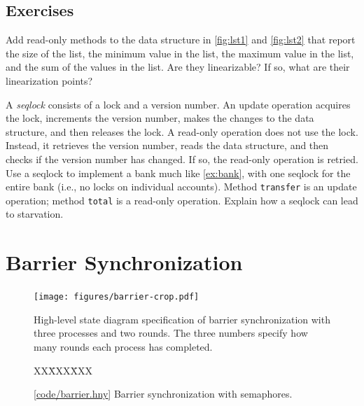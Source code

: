 \documentclass{report}
\newcommand{\harmonysource}[1]{
\begin{tabbing}
XX\=XXX\=XXX\kill
    
\end{tabbing}
}
\newcommand{\harmonylink}[1]{%
[\href{https://www.cs.cornell.edu/home/rvr/harmony/#1}{\underline{#1}}]%
}
\newenvironment{code}{
\tcolorbox
}{
\endtcolorbox
}
\begin{document}
\section*{Exercises}
\begin{problems}
\item Add read-only methods to the data structure in \autoref{fig:lst1}
and \autoref{fig:lst2} that report the size of the list, the minimum value in the
list, the maximum value in the list, and the sum of the values in the list.
Are they linearizable?  If so, what are their linearization points?
\item A \emph{seqlock}
%
consists of a lock and a version number.
An update operation acquires the lock, increments the version number, makes the
changes to the data structure, and then releases the lock.  A read-only operation
does not use the lock.  Instead, it retrieves the version number,
reads the data structure, and then checks if the
version number has changed.  If so, the read-only operation is retried.
Use a seqlock to implement a bank much like \autoref{ex:bank}, with
one seqlock for the entire bank (i.e., no locks on individual accounts).
Method \texttt{transfer} is an update operation; method \texttt{total} is a
read-only operation.  Explain how a seqlock can lead to starvation.
\end{problems}

\chapter{Barrier Synchronization}
\label{ch:barrier}
%

%

\begin{figure}
\begin{center}
\texttt{[image: figures/barrier-crop.pdf]}
\end{center}
\caption{High-level state diagram specification of barrier synchronization
with three processes and two rounds.  The three numbers specify how many
rounds each process has completed.}
\label{fig:barrierdiagram}
\end{figure}

\begin{figure}
\begin{code}
\harmonysource{barrier}
\end{code}
\caption{\harmonylink{code/barrier.hny} Barrier synchronization with semaphores.}
\label{fig:barrier}
\end{figure}
\end{document}
